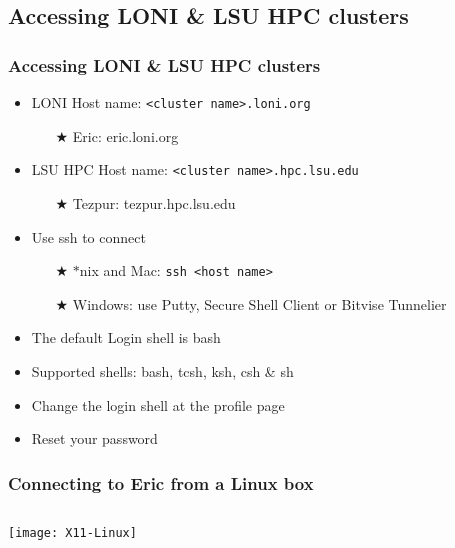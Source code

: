 \documentclass[slidestop,mathserif,compress,xcolor=svgnames,table]{beamer}
\newcommand*\vardiamond{\textcolor{tigerspurple}{%
  \ensuremath{\blacklozenge}}}
\begin{document}
\subsection{Accessing LONI \& LSU HPC clusters}
\begin{frame}
\frametitle{\small Accessing LONI \& LSU HPC clusters}
\begin{itemize}
\item LONI Host name: \texttt{<cluster name>.loni.org}
\begin{itemize}
\item[$\bigstar$] Eric: eric.loni.org
\end{itemize}
\item LSU HPC Host name: \texttt{<cluster name>.hpc.lsu.edu}
\begin{itemize}
\item[$\bigstar$] Tezpur: tezpur.hpc.lsu.edu
\end{itemize}
\item Use ssh to connect
\begin{itemize}
\item[$\bigstar$] $\ast$nix and Mac: \texttt{ssh <host name>}
\item[$\bigstar$] Windows: use Putty, Secure Shell Client or Bitvise Tunnelier
\end{itemize}
\item The default Login shell is bash
\item Supported shells: bash, tcsh, ksh, csh \& sh
\item Change the login shell at the profile page
\item Reset your password
\end{itemize}
\end{frame}

\begin{frame}
\frametitle{\small Connecting to Eric from a Linux box}
\begin{columns}
\column{12cm}
\begin{center}
\texttt{[image: X11-Linux]}
\end{center}
\end{columns}
\end{frame}
\end{document}

